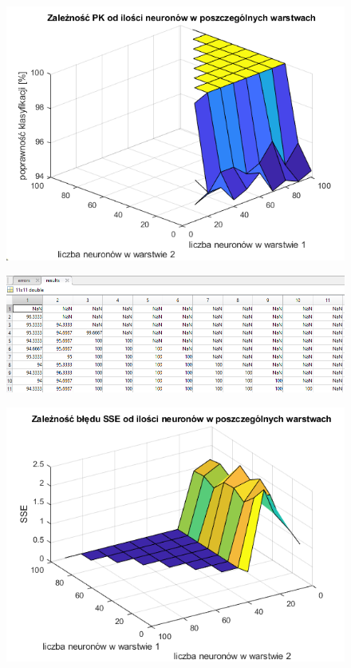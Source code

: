 \documentclass[a4paper, 12pt]{report}
\begin{document}
\begin{figure}[hbt!]
\includegraphics[width=14cm]{lr1 pk}
\centering
\end{figure}
\begin{figure}[hbt!]

\includegraphics[width=14cm]{lr1 pk dane}
\centering
\end{figure}

\begin{figure}[hbt!]
\includegraphics[width=14cm]{lr1 sse}
\centering
\end{figure}
\end{document}
